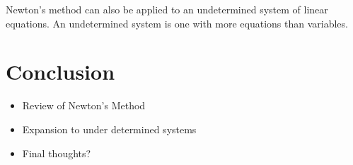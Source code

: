 \documentclass{article}
\begin{document}
Newton's method \cite{atkinson1991introduction}can also be applied to an undetermined system of linear equations. An undetermined system is one with more equations than variables. 


\section{Conclusion}
\begin{itemize}
    \item Review of Newton's Method
    \item Expansion to under determined systems
    \item Final thoughts?
\end{itemize}



%

\end{document}
